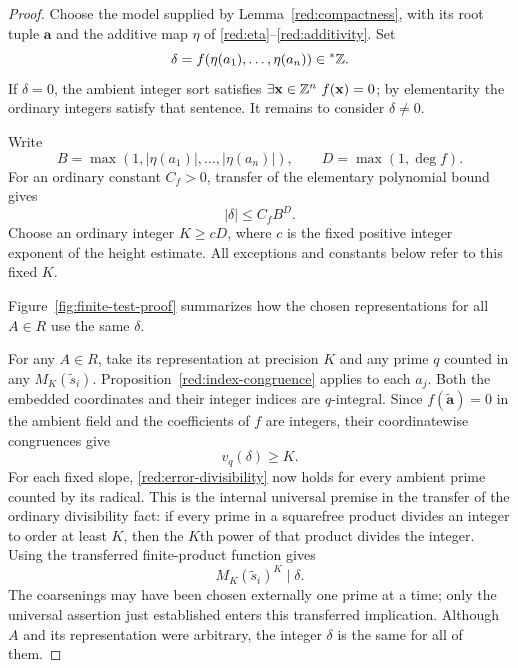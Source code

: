 \begin{proof}
Choose the model supplied by Lemma~\ref{red:compactness}, with its
root tuple $\mathbf a$ and the additive map $\eta$ of
\eqref{red:eta}--\eqref{red:additivity}. Set
\[
             \delta=f(\eta(a_1),\ldots,\eta(a_n))\in{}^*\mathbb Z.
\]
If $\delta=0$, the ambient integer sort satisfies
$\exists\mathbf x\in\mathbb Z^n\ f(\mathbf x)=0$; by elementarity the
ordinary integers satisfy that sentence. It remains to consider
$\delta\ne0$.

Write
\begin{equation}\label{red:B-D}
 B=\max(1,|\eta(a_1)|,\ldots,|\eta(a_n)|),\qquad
 D=\max(1,\deg f).
\end{equation}
For an ordinary constant $C_f>0$, transfer of the elementary polynomial
bound gives
\begin{equation}\label{red:error-bound}
                              |\delta|\le C_f B^D.
\end{equation}
Choose an ordinary integer $K\ge cD$, where $c$ is the fixed positive
integer exponent of the height estimate. All exceptions and constants
below refer to this fixed $K$.

Figure~\ref{fig:finite-test-proof} summarizes how the chosen representations
for all \(A\in R\) use the same \(\delta\).



For any $A\in R$, take its representation at precision $K$ and
any prime $q$ counted in any $M_K(\widetilde s_i)$.
Proposition~\ref{red:index-congruence} applies to each $a_j$.
Both the embedded coordinates and their integer indices are
\(q\)-integral. Since \(f(\widetilde{\mathbf a})=0\) in the ambient
field and the coefficients of \(f\) are integers, their coordinatewise
congruences give
\begin{equation}\label{red:error-divisibility}
                                  v_q(\delta)\ge K.
\end{equation}
For each fixed slope, \eqref{red:error-divisibility} now holds for
every ambient prime counted by its radical. This is the internal
universal premise in the transfer of the ordinary divisibility fact:
if every prime in a squarefree product divides an integer to order at
least \(K\), then the \(K\)th power of that product divides the integer.
Using the transferred finite-product function gives
\begin{equation}\label{red:radical-divides}
                             M_K(\widetilde s_i)^K\mid\delta.
\end{equation}
The coarsenings may have been chosen externally one prime at a time;
only the universal assertion just established enters this transferred
implication. Although \(A\) and its representation were arbitrary,
the integer \(\delta\) is the same for all of them.


\end{proof}
